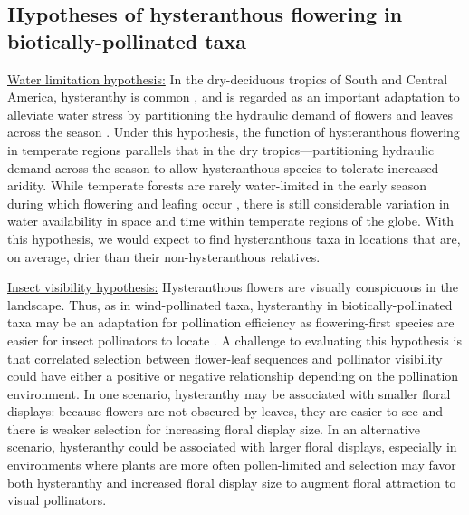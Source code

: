 \documentclass{article}[12pt]
\begin{document}
\subsection*{Hypotheses of hysteranthous flowering in biotically-pollinated taxa}

\underline{Water limitation hypothesis:} In the dry-deciduous tropics of South and Central America, hysteranthy is common \citep{Rathcke_1985,Franklin2016}, and is regarded as an important adaptation to alleviate water stress by partitioning the hydraulic demand of flowers and leaves across the season \citep{Gougherty2018,Franklin2016,Borchert1983,Reich1984}. Under this hypothesis, the function of hysteranthous flowering in temperate regions parallels that in the dry tropics---partitioning hydraulic demand across the season to allow hysteranthous species to tolerate increased aridity. While temperate forests are rarely water-limited in the early season during which flowering and leafing occur \citep{Polgar2011}, there is still considerable variation in water availability in space and time within temperate regions of the globe.  With this hypothesis, we would expect to find hysteranthous taxa in locations that are, on average, drier than their non-hysteranthous relatives.

\underline{Insect visibility hypothesis:} Hysteranthous flowers are visually conspicuous in the landscape. Thus, as in wind-pollinated taxa, hysteranthy in biotically-pollinated taxa may be an adaptation for pollination efficiency as flowering-first species are easier for insect pollinators to locate \citep{Janzen1967}. A challenge to evaluating this hypothesis is that correlated selection between flower-leaf sequences and pollinator visibility could have either a positive or negative relationship depending on the pollination environment. In one scenario, hysteranthy may be associated with smaller floral displays: because flowers are not obscured by leaves, they are easier to see and there is weaker selection for increasing floral display size. In an alternative scenario, hysteranthy could be associated with larger floral displays, especially in environments where plants are more often pollen-limited and selection may favor both hysteranthy and increased floral display size to augment floral attraction to visual pollinators.
\end{document}
